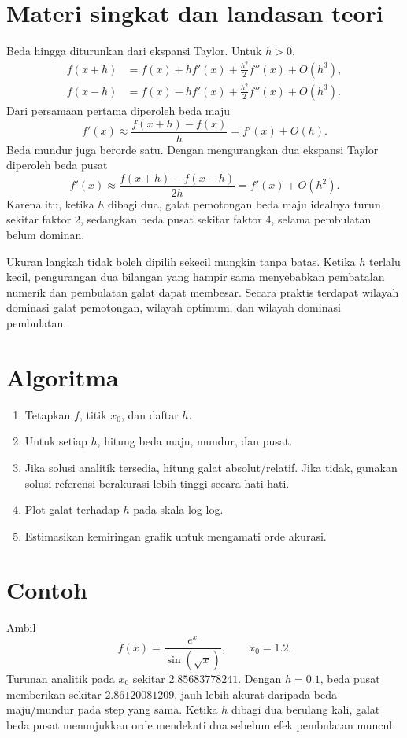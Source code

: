 \documentclass[book,english,noindex,lean,nobackpage,nocopyright,noupdate,nofiglist,notablist]{enacom}
\begin{document}
\section{Materi singkat dan landasan teori}
Beda hingga diturunkan dari ekspansi Taylor. Untuk $h>0$,
\begin{align}
f(x+h)&=f(x)+hf'(x)+\frac{h^2}{2}f''(x)+O(h^3),\\
f(x-h)&=f(x)-hf'(x)+\frac{h^2}{2}f''(x)+O(h^3).
\end{align}
Dari persamaan pertama diperoleh beda maju
\begin{equation}
f'(x)\approx\frac{f(x+h)-f(x)}{h}=f'(x)+O(h).
\end{equation}
Beda mundur juga berorde satu. Dengan mengurangkan dua ekspansi Taylor diperoleh beda pusat
\begin{equation}
f'(x)\approx\frac{f(x+h)-f(x-h)}{2h}=f'(x)+O(h^2).
\end{equation}
Karena itu, ketika $h$ dibagi dua, galat pemotongan beda maju idealnya turun sekitar faktor 2, sedangkan beda pusat sekitar faktor 4, selama pembulatan belum dominan.

Ukuran langkah tidak boleh dipilih sekecil mungkin tanpa batas. Ketika $h$ terlalu kecil, pengurangan dua bilangan yang hampir sama menyebabkan pembatalan numerik dan pembulatan galat dapat membesar. Secara praktis terdapat wilayah dominasi galat pemotongan, wilayah optimum, dan wilayah dominasi pembulatan.

\section{Algoritma}
\begin{enumerate}
\item Tetapkan $f$, titik $x_0$, dan daftar $h$.
\item Untuk setiap $h$, hitung beda maju, mundur, dan pusat.
\item Jika solusi analitik tersedia, hitung galat absolut/relatif. Jika tidak, gunakan solusi referensi berakurasi lebih tinggi secara hati-hati.
\item Plot galat terhadap $h$ pada skala log-log.
\item Estimasikan kemiringan grafik untuk mengamati orde akurasi.
\end{enumerate}

\section{Contoh}
Ambil
\begin{equation}
f(x)=\frac{e^x}{\sin(\sqrt{x})},\qquad x_0=1.2.
\end{equation}
Turunan analitik pada $x_0$ sekitar $2.85683778241$. Dengan $h=0.1$, beda pusat memberikan sekitar $2.86120081209$, jauh lebih akurat daripada beda maju/mundur pada step yang sama. Ketika $h$ dibagi dua berulang kali, galat beda pusat menunjukkan orde mendekati dua sebelum efek pembulatan muncul.
\end{document}
